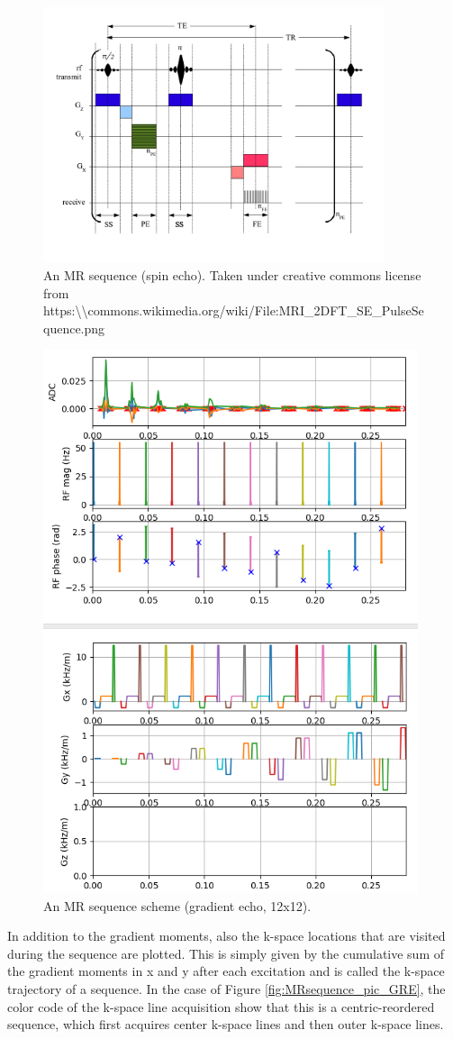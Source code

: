 \documentclass[a4paper,12pt]{extarticle}
\begin{document}
\begin{figure}[!ht] 
\centering
\includegraphics[width=10cm]{img/MRI_2DFT_SE_PulseSequence.png}
\caption{An MR sequence (spin echo). Taken under creative commons license from https:\textbackslash\textbackslash commons.wikimedia.org/wiki/File:MRI\_2DFT\_SE\_PulseSequence.png } \label{fig:MRsequence_SE}
\end{figure}

\begin{figure}[!ht] 
\centering
\includegraphics[width=11cm]{img/seq_FLASH.png}
\caption{An MR sequence scheme (gradient echo, 12x12). }
\label{fig:MRsequence_GRE}
\end{figure}
 In addition to the gradient moments, also the k-space locations that are visited during the sequence are plotted. This is simply given by the cumulative sum of the gradient moments in x and y after each excitation and is called the k-space trajectory of a sequence. In the case of Figure \ref{fig:MRsequence_pic_GRE}, the color code of the k-space line acquisition show that this is a centric-reordered sequence, which first acquires center k-space lines and then outer k-space lines. 
\end{document}
